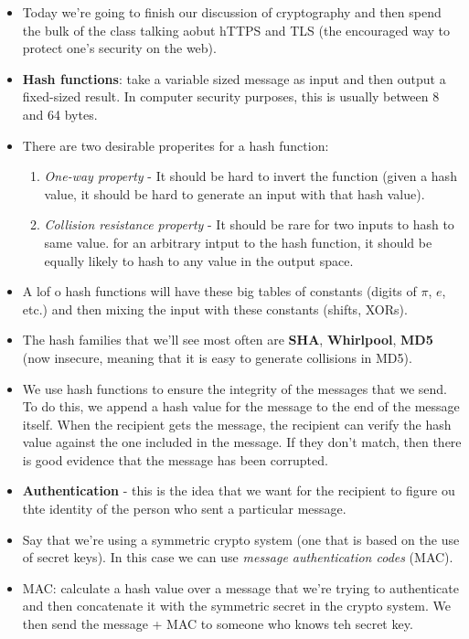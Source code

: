 \documentclass[12pt]{article}
\theoremstyle{definition}
\begin{document}
\begin{itemize}
    \itemsep0em 
	\item  Today we're going to finish our discussion of cryptography and then spend the bulk of the class talking aobut hTTPS and TLS (the encouraged way to protect one's security on the web).
    \item \textbf{Hash functions}: take a variable sized message as input and then output a fixed-sized result. In computer security purposes, this is usually between 8 and 64 bytes. 
    \item There are two desirable properites for a hash function:
        \begin{enumerate}
            \itemsep0em 
            \item \textit{One-way property} - It should be hard to invert the function (given a hash value, it should be hard to generate an input with that hash value).
            \item \textit{Collision resistance property} - It should be rare for two inputs to hash to same value. for an arbitrary intput to the hash function, it should be equally likely to hash to any value in the output space.
        \end{enumerate}
    \item A lof o hash functions will have these big tables of constants (digits of $\pi$, $e$, etc.) and then mixing the input with these constants (shifts, XORs).
    \item The hash families that we'll see most often are \textbf{SHA}, \textbf{Whirlpool}, \textbf{MD5} (now insecure, meaning that it is easy to generate collisions in MD5).
    \item We use hash functions to ensure the integrity of the messages that we send. To do this, we append a hash value for the message to the end of the message itself. When the recipient gets the message, the recipient can verify the hash value against the one included in the message. If they don't match, then there is good evidence that the message has been corrupted.
    \item \textbf{Authentication} - this is the idea that we want for the recipient to figure ou thte identity of the person who sent a particular message. 
    \item Say that we're using a symmetric crypto system (one that is based on the use of secret keys). In this case we can use \textit{message authentication codes} (MAC). 
    \item MAC: calculate a hash value over a message that we're trying to authenticate and then concatenate it with the symmetric secret in the crypto system. We then send the message + MAC to someone who knows teh secret key.

\end{itemize}
\end{document}
